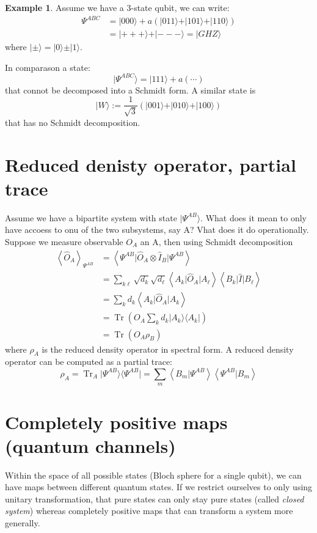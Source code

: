 \documentclass[12pt]{book}
\theoremstyle{definition}
\newtheorem*{example}{\bfseries Example}
\newcommand{\scalar}[1]{\left\langle {#1}\right\rangle}
\let\oldsum\sum
\renewcommand{\sum}[2]{\oldsum\limits_{#1}^{#2}}
\newcommand{\para}[1]{\left( {#1} \right)}
\newcommand{\bra}[1]{\langle {#1} \vert}
\newcommand{\ket}[1]{\vert {#1} \rangle}
\DeclareMathOperator{\tr}{Tr}
\begin{document}
\begin{example}
Assume we have a 3-state qubit, we can write:
\begin{align*}
  \Psi^{ABC} & = \ket{000} + a \para{\ket{011} + \ket{101} + \ket{110}} \\
  & = \ket{+++} + \ket{---} = \ket{GHZ}
\end{align*}
where $\ket{\pm} = \ket{0} \pm \ket{1}$.

In comparason a state:
\begin{equation*}
  \ket{\Psi^{ABC}} = \ket{111} + a \para{\cdots}
\end{equation*}
that connot be decomposed into a Schmidt form. A similar state is
\begin{equation*}
  \ket{W} := \frac{1}{\sqrt{3}} \para{\ket{001} + \ket{010} + \ket{100}}
\end{equation*}
that has no Schmidt decomposition.
\end{example}

\section{Reduced denisty operator, partial trace}

Assume we have a bipartite system with state $\ket{\Psi^{AB}}$. What does it mean to only have accoess to onu of the two subsystems, say A? Vhat does it do operationally. Suppose we measure observable $O_A$ an A, then using Schmidt decomposition
\begin{align*}
  \scalar{\hat O_A}_{\Psi^{AB}} & = \scalar{\Psi^{AB} \vert \hat O_A \otimes \hat I_B \vert \Psi^{AB}} \\
  & = \oldsum_{k\ell} \sqrt{d_k} \sqrt{d_\ell} \scalar{A_k \vert \hat O_A \vert A_\ell} \scalar{B_k \vert \hat I \vert B_\ell} \\
  & = \oldsum_{k} d_k \scalar{A_k \vert \hat O_A \vert A_k} \\
  & = \tr\para{O_A \oldsum_k d_k \ket{A_k} \bra{A_k}} \\
  & = \tr\para{O_A \rho_B}
\end{align*}
where $\rho_A$ is the reduced density operator in spectral form. A reduced density operator can be computed as a partial trace:
\begin{equation}
  \rho_A = \tr_A \ket{\Psi^{AB}} \bra{\Psi^{AB}} = \oldsum_m \scalar{B_m \vert \Psi^{AB}} \scalar{\Psi^{AB} \vert B_m}
\end{equation}


\section{Completely positive maps (quantum channels)}
Within the space of all possible states (Bloch sphere for a single qubit), we can have maps between different quantum states. If we restrict ourselves to only using unitary transformation, that pure states can only stay pure states (called \emph{closed system}) whereas completely positive maps that can transform a system more generally.
\end{document}
